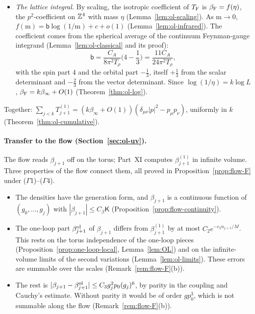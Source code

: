 \begin{itemize}
\item \emph{The lattice integral.} By scaling, the isotropic coefficient of $T_{\rm F}$ is $\beta_{\rm F}=f(\eta)$, the $p^2$-coefficient on $\mathbb Z^4$ with mass $\eta$ (Lemma~\ref{lem:ol-scaling}). As $\mathrm m\to0$, $f(\mathrm m)=\mathsf b\log(1/\mathrm m)+c+o(1)$ (Lemma~\ref{lem:ol-infrared}). The coefficient comes from the spherical average of the continuum Feynman-gauge integrand (Lemma~\ref{lem:ol-classical} and its proof):
\[
\mathsf b=\frac{C_A}{8\pi^2T_\rho}\Big(4-\frac13\Big)=\frac{11C_A}{24\pi^2T_\rho},
\]
with the spin part $4$ and the orbital part $-\frac13$, itself $+\frac13$ from the scalar determinant and $-\frac23$ from the vector determinant. Since $\log(1/\eta)=k\log L$, $\beta_{\rm F}=k\beta_\infty+O(1)$ (Theorem~\ref{thm:ol-log}).
\end{itemize}
Together: $\sum_{j<k}T^{(1)}_{j+1}=(k\beta_\infty+O(1))(\delta_{\mu\nu}|p|^2-p_\mu p_\nu)$, uniformly in $k$ (Theorem~\ref{thm:ol-cumulative}).

\paragraph{Transfer to the flow (Section~\ref{sec:ol-uv}).} The flow reads $\beta_{j+1}$ off on the torus; Part~XI computes $\beta^{(1)}_{j+1}$ in infinite volume. Three properties of the flow connect them, all proved in Proposition~\ref{prop:flow-F} under ($\Gamma$1)--($\Gamma$4).
\begin{itemize}
\item[(F1)] The densities have the generation form, and $\beta_{j+1}$ is a continuous function of $(g_0,\dots,g_j)$ with $|\beta_{j+1}|\le C_\beta\mathsf K$ (Proposition~\ref{prop:flow-continuity}).
\item[(F2)] The one-loop part $\beta^{\rm ol}_{j+1}$ of $\beta_{j+1}$ differs from $\beta^{(1)}_{j+1}$ by at most $C_2e^{-c_2n_{j+1}/M}$. This rests on the torus independence of the one-loop pieces (Proposition~\ref{prop:one-loop-local}, Lemma~\ref{lem:OL}) and on the infinite-volume limits of the second variations (Lemma~\ref{lem:ol-limits}). These errors are summable over the scales (Remark~\ref{rem:flow-F}(b)).
\item[(F3)] The rest is $|\beta_{j+1}-\beta^{\rm ol}_{j+1}|\le C_3g_j^2p_0(g_j)^6$, by parity in the coupling and Cauchy's estimate. Without parity it would be of order $gp_0^3$, which is not summable along the flow (Remark~\ref{rem:flow-F}(b)).
\end{itemize}

